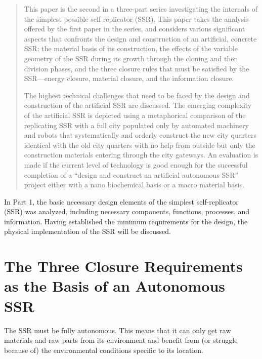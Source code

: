 
\begin{abstract}
This paper is the second in a three-part series investigating the internals 
of the simplest possible self replicator (SSR).  
This paper takes the
analysis offered by the first paper in the series, and considers various 
significant aspects that confronts the
design and construction of an artificial, concrete SSR: the material
basis of its construction, the effects of the variable geometry of the
SSR during its growth through the cloning and then division phases, and the
three closure rules that must be satisfied by the SSR---energy closure,
material closure, and the information closure.

The highest technical
challenges that need to be faced by the design and construction of the
artificial SSR are discussed. The emerging complexity of the artificial
SSR is depicted using a metaphorical comparison of the replicating SSR
with a full city populated only by automated machinery and robots that
systematically and orderly construct the new city quarters identical
with the old city quarters with no help from outside but only the
construction materials entering through the city gateways. An
evaluation is made if the current level of technology is good enough
for the successful completion of a “design and construct an artificial
autonomous SSR” project either with a nano biochemical basis or a macro
material basis. 
\end{abstract}

In Part 1, the basic necessary design elements of the simplest self-replicator (SSR) 
was analyzed, including necessary components, functions, processes, and information.
Having established the minimum requirements for the design, the physical implementation
of the SSR will be discussed.

\section{The Three Closure Requirements as the Basis of an Autonomous SSR}

The SSR must be fully autonomous. This means that it can only get raw
materials and raw parts from its environment and benefit from (or
struggle because of) the environmental conditions specific to its
location.

